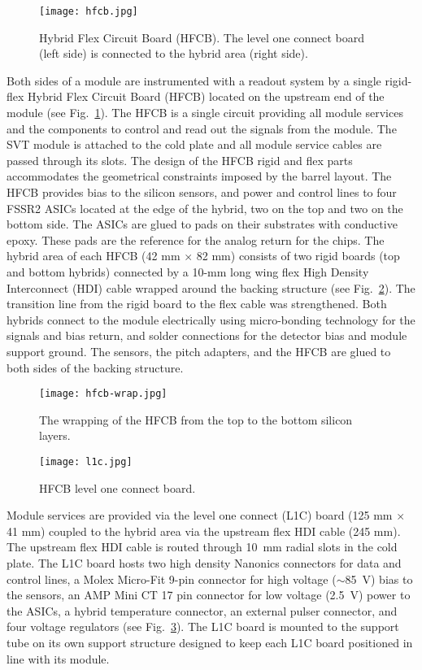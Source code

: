 \begin{figure}[hbt] 
\centering 
\texttt{[image: hfcb.jpg]}
\caption{Hybrid Flex Circuit Board (HFCB). The level one connect board (left side) is connected to the hybrid area (right side).}
\label{fig:HFCB}
\end{figure}

Both sides of a module are instrumented with a readout system by a single rigid-flex Hybrid Flex Circuit Board (HFCB) located on the upstream end of the module (see Fig.~\ref{fig:HFCB}). The HFCB is a single circuit providing all module services and the components to control and read out the signals from the module. The SVT module is attached to the cold plate and all module service cables are passed through its slots. The design of the HFCB rigid and flex parts accommodates the geometrical constraints imposed by the barrel layout. The HFCB provides bias to the silicon sensors, and power and control lines to four FSSR2 ASICs located at the edge of the hybrid, two on the top and two on the bottom side. The ASICs are glued to pads on their substrates with conductive epoxy. These pads are the reference for the analog return for the chips. The hybrid area of each HFCB (42 mm $\times$ 82 mm) consists of two rigid boards (top and bottom hybrids) connected by a 10-mm long wing flex High Density Interconnect (HDI) cable wrapped around the backing structure (see Fig.~\ref{fig:hfcb-wrap}). The transition line from the rigid board to the flex cable was strengthened. Both hybrids connect to the module electrically using micro-bonding technology for the signals and bias return, and solder connections for the detector bias and module support ground. The sensors, the pitch adapters, and the HFCB are glued to both sides of the backing structure. 

\begin{figure}[hbt] 
\centering 
\texttt{[image: hfcb-wrap.jpg]}
\caption{The wrapping of the HFCB from the top to the bottom silicon layers.}
\label{fig:hfcb-wrap}
\end{figure}

\begin{figure}[hbt] 
\centering 
\texttt{[image: l1c.jpg]}
\caption{HFCB level one connect board.}
\label{fig:l1c}
\end{figure}

Module services are provided via the level one connect (L1C) board (125 mm $\times$ 41 mm) coupled to the hybrid area via the upstream flex HDI cable (245 mm). The upstream flex HDI cable is routed through 10~mm radial slots in the cold plate. The L1C board hosts two high density Nanonics connectors for data and control lines, a Molex Micro-Fit 9-pin connector for high voltage ($\sim$85~V) bias to the sensors, an AMP Mini CT 17 pin connector for low voltage (2.5~V) power to the ASICs, a hybrid temperature connector, an external pulser connector, and four voltage regulators (see Fig.~\ref{fig:l1c}). The L1C board is mounted to the support tube on its own support structure designed to keep each L1C board positioned in line with its module.

